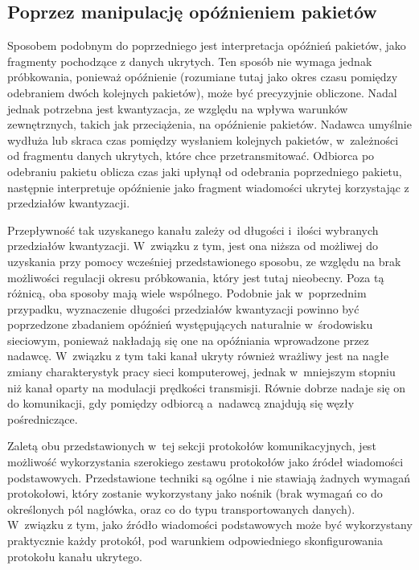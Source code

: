 \documentclass[a4paper, twoside, 12pt]{report}
\begin{document}
        \subsection{Poprzez manipulację opóźnieniem pakietów}
        Sposobem podobnym do poprzedniego jest interpretacja opóźnień pakietów,
        jako fragmenty pochodzące z danych ukrytych.\cite{IPDELAYCHANNEL} Ten sposób nie wymaga jednak próbkowania,
        ponieważ opóźnienie (rozumiane tutaj jako okres czasu pomiędzy odebraniem dwóch
        kolejnych pakietów), może być precyzyjnie obliczone. Nadal jednak potrzebna
        jest kwantyzacja, ze względu na wpływa warunków zewnętrznych, takich jak przeciążenia,
        na opóźnienie pakietów. Nadawca umyślnie wydłuża lub skraca czas pomiędzy
        wysłaniem kolejnych pakietów, w~zależności od fragmentu danych ukrytych,
        które chce przetransmitować. Odbiorca po odebraniu pakietu oblicza czas jaki
        upłynął od odebrania poprzedniego pakietu, następnie
        interpretuje opóźnienie jako fragment wiadomości ukrytej korzystając z
        przedziałów kwantyzacji.

        Przepływność tak uzyskanego kanału zależy od długości i~ilości wybranych
        przedziałów kwantyzacji. W~związku z tym, jest ona niższa od możliwej do
        uzyskania przy pomocy wcześniej przedstawionego sposobu, ze względu na brak
        możliwości regulacji okresu próbkowania, który jest tutaj nieobecny. Poza tą różnicą, oba sposoby mają
        wiele wspólnego. Podobnie jak w~poprzednim przypadku, wyznaczenie długości
        przedziałów kwantyzacji powinno być poprzedzone zbadaniem opóźnień występujących
        naturalnie w~środowisku sieciowym, ponieważ nakładają się one na opóźniania
        wprowadzone przez nadawcę. W~związku z tym taki kanał ukryty również wrażliwy jest
        na nagłe zmiany charakterystyk pracy sieci komputerowej, jednak w~mniejszym
        stopniu niż kanał oparty na modulacji prędkości transmisji. Równie dobrze
        nadaje się on do komunikacji, gdy pomiędzy odbiorcą a~nadawcą znajdują się
        węzły pośredniczące.

        Zaletą obu przedstawionych w~tej sekcji protokołów komunikacyjnych,
        jest możliwość wykorzystania szerokiego zestawu protokołów jako
        źródeł wiadomości podstawowych. Przedstawione techniki są ogólne i
        nie stawiają żadnych wymagań protokołowi, który zostanie wykorzystany jako
        nośnik (brak wymagań co do określonych pól nagłówka, oraz co do typu transportowanych danych).
        W~związku z tym, jako źródło wiadomości podstawowych może być wykorzystany
        praktycznie każdy protokół, pod warunkiem odpowiedniego skonfigurowania
        protokołu kanału ukrytego.
\end{document}
